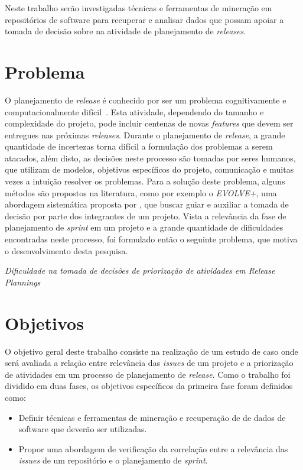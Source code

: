 Neste trabalho serão investigadas técnicas e ferramentas de mineração em repositórios de software para recuperar e analisar dados que possam apoiar a tomada de decisão sobre na atividade de planejamento de \textit{releases}.

\section{Problema}
\label{int:pro}
O planejamento de \textit{release} é conhecido por ser um problema cognitivamente e computacionalmente difícil~\cite{Ngo}. Esta atividade, dependendo do tamanho e complexidade do projeto, pode incluir centenas de novas \textit{features} que devem ser entregues nas próximas \textit{releases}. Durante o planejamento de \textit{release}, a grande quantidade de incertezas torna difícil a formulação dos problemas a serem atacados, além disto, as decisões neste processo são tomadas por seres humanos, que utilizam de modelos, objetivos específicos do projeto, comunicação e muitas vezes a intuição resolver os problemas. Para a solução deste problema, alguns métodos são propostos na literatura, como por exemplo o \textit{EVOLVE+}, uma abordagem sistemática proposta por \cite{Ngo}, que buscar guiar e auxiliar a tomada de decisão por parte dos integrantes de um projeto. Vista a relevância da fase de planejamento de \textit{sprint} em um projeto e a grande quantidade de dificuldades encontradas neste processo, foi formulado então  o seguinte problema, que motiva o desenvolvimento desta pesquisa.

\begin{center}
 \textit{Dificuldade na tomada de decisões de priorização de atividades em \textit{Release Plannings}}
\end{center}

\section{Objetivos}
\label{int:obj}

O objetivo geral deste trabalho consiste na realização de um estudo de caso onde será avaliada a relação entre relevância das \textit{issues} de um projeto e a priorização de atividades em um processo de planejamento de \textit{release}. Como o trabalho foi dividido em duas fases, os objetivos específicos da primeira fase foram definidos como:

\begin{itemize}
    \item Definir técnicas e ferramentas de mineração e recuperação de de dados de software que deverão ser utilizadas.
    \item Propor uma abordagem de verificação da correlação entre a relevância das \textit{issues} de um repositório e o planejamento de \textit{sprint}.
\end{itemize}

